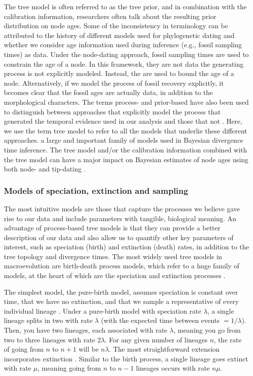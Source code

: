 The tree model is often referred to as the tree prior, and in combination with the calibration information, researchers often talk about the resulting prior distribution on node ages.
Some of the inconsistency in terminology can be attributed to the history of different models used for phylogenetic dating and whether we consider age information used during inference (e.g., fossil sampling times) as data.
Under the node-dating approach, fossil sampling times are used to constrain the age of a node.
In this framework, they are not data  the generating process is not explicitly modeled.
Instead, the  are used to bound the age of a node.
Alternatively, if we model the process of fossil recovery explicitly, it becomes clear that the fossil ages are actually data, in addition to the morphological characters.
The terms process- and prior-based have also been used to distinguish between approaches that explicitly model the  process that generated the temporal evidence used in our analysis and those that  not \citep{Landis2016}.
Here, we use the term tree model to refer to all the models that underlie these different approaches.
 a large and important family of models used in Bayesian divergence time inference.
The tree model and/or the calibration information combined with the tree model can have a major impact on Bayesian estimates of node ages using both node- and tip-dating \citep[e.g.,][]{Ho2009,OReilly2015,Warnock2015,matzke2016,Matschiner2017}.

\subsubsection{Models of speciation, extinction and sampling}

The most intuitive models are those that capture the processes we believe gave rise to our data and include parameters with tangible, biological meaning.
An advantage of process-based tree models is that they can provide a better description of our data and also allow us to quantify other key parameters of interest, such as speciation (birth) and extinction (death) rates, in addition to the tree topology and divergence times.
The most widely used tree models in macroevolution are birth-death process models, which refer to a huge family of models, at the heart of which are the speciation and extinction processes .

The simplest model, the pure-birth model, assumes speciation is constant over time, that we have no extinction, and that we sample a representative of every individual lineage \citep{Yule1925}.
Under a pure-birth model with speciation rate $\lambda$, a single lineage splits in two with rate $\lambda$ (with the expected time between events $=1/\lambda$). Then, you have two lineages, each associated with rate $\lambda$, meaning you go from two to three lineages with rate 2$\lambda$. For any given number of lineages $n$, the rate of going from $n$ to $n+1$ will be $n\lambda$.
The most straightforward extension incorporates  extinction \citep{Kendall1948}.
Similar to the birth process, a single lineage goes extinct with rate $\mu$, meaning going from $n$ to $n-1$ lineages occurs with rate $n\mu$.

